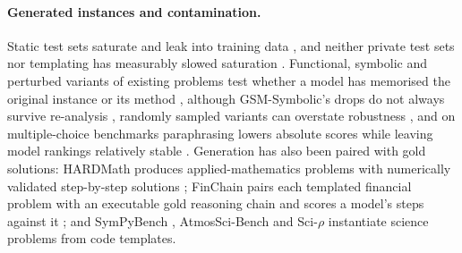 \paragraph{Generated instances and contamination.}
Static test sets saturate \citep{ott2022saturation,akhtar2026benchmarksaturation} and leak into training data \citep{deng2024contamination,zhang2024gsm1k}, and neither private test sets nor templating has measurably slowed saturation \citep{akhtar2026benchmarksaturation}.
Functional, symbolic and perturbed variants of existing problems test whether a model has memorised the original instance or its method \citep{srivastava2024functionalbench,mirzadeh2024gsmsymbolic,gulati2024putnamaxiom,huang2025mathperturb}, although GSM-Symbolic's drops do not always survive re-analysis \citep{dlugosz2026gsmsymbolicreeval}, randomly sampled variants can overstate robustness \citep{mondorf2026lpds}, and on multiple-choice benchmarks paraphrasing lowers absolute scores while leaving model rankings relatively stable \citep{lunardi2025paraphraserobustness}.
Generation has also been paired with gold solutions: HARDMath produces applied-mathematics problems with numerically validated step-by-step solutions \citep{fan2024hardmath}; FinChain pairs each templated financial problem with an executable gold reasoning chain and scores a model's steps against it \citep{xie2025finchain}; and SymPyBench \citep{imani2025sympybench}, AtmosSci-Bench \citep{li2025atmosscibench} and Sci-$\rho$ \citep{azmi2026scirho} instantiate science problems from code templates.

